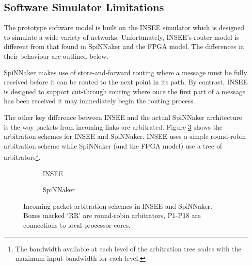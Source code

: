 		\subsection{Software Simulator Limitations}
		
			The prototype software model is built on the INSEE simulator
			\cite{navaridas11insee} which is designed to simulate a wide variety of
			networks. Unfortunately, INSEE's router model is different from that found
			in SpiNNaker and the FPGA model. The differences in their behaviour are
			outlined below.
			
			
			SpiNNaker makes use of store-and-forward routing where a message must be
			fully received before it can be routed to the next point in its path. By
			contrast, INSEE is designed to support cut-through routing where once the
			first part of a message has been received it may immediately begin the
			routing process.
			
			The other key difference between INSEE and the actual SpiNNaker
			architecture is the way packets from incoming links are arbitrated. Figure
			\ref{fig:arbitration} shows the arbitration schemes for INSEE and
			SpiNNaker. INSEE uses a simple round-robin arbitration scheme while
			SpiNNaker (and the FPGA model) use a tree of arbitrators\footnote{The
			bandwidth available at each level of the arbitration tree scales with the
			maximum input bandwidth for each level.}.
			
			\begin{figure}
				\begin{subfigure}[t]{0.50\textwidth}
					\center
					
					
					\caption{INSEE}
					\label{fig:arbitrationINSEE}
				\end{subfigure}
				\begin{subfigure}[t]{0.50\textwidth}
					\center
					
					
					\caption{SpiNNaker}
					\label{fig:arbitrationSpiNNaker}
				\end{subfigure}
				
				\caption[Incoming packet arbitration schemes in INSEE and
				SpiNNaker]{Incoming packet arbitration schemes in INSEE and SpiNNaker.
				Boxes marked `RR' are round-robin arbitrators, P1-P18 are connections to
				local processor cores.}
				\label{fig:arbitration}
			\end{figure}
			
